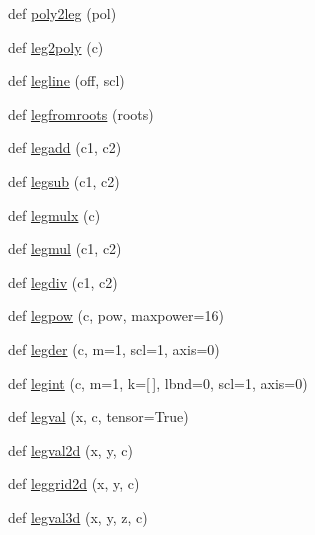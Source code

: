 \begin{DoxyCompactItemize}
\item 
def \hyperlink{namespacenumpy_1_1polynomial_1_1legendre_a64b1806cfd4b9d30acd2e1d549eda549}{poly2leg} (pol)
\item 
def \hyperlink{namespacenumpy_1_1polynomial_1_1legendre_aa88cb7adb4a3cc61a468ceafa8f18189}{leg2poly} (c)
\item 
def \hyperlink{namespacenumpy_1_1polynomial_1_1legendre_acb9eab48c02cb6ebfb9adb1373052b0a}{legline} (off, scl)
\item 
def \hyperlink{namespacenumpy_1_1polynomial_1_1legendre_a77e979bb265a23eed2e9625d13f54299}{legfromroots} (roots)
\item 
def \hyperlink{namespacenumpy_1_1polynomial_1_1legendre_a05031afb4d6c15bb84ba982a362b78c2}{legadd} (c1, c2)
\item 
def \hyperlink{namespacenumpy_1_1polynomial_1_1legendre_af5bfa3c9039d6f2635090f103fc4dc50}{legsub} (c1, c2)
\item 
def \hyperlink{namespacenumpy_1_1polynomial_1_1legendre_a2984b2d596308fda9790e1a276447a61}{legmulx} (c)
\item 
def \hyperlink{namespacenumpy_1_1polynomial_1_1legendre_aa6f050bcc0e660b48550fbaf524f772b}{legmul} (c1, c2)
\item 
def \hyperlink{namespacenumpy_1_1polynomial_1_1legendre_a7ceace6a332caef0058cd77820c06773}{legdiv} (c1, c2)
\item 
def \hyperlink{namespacenumpy_1_1polynomial_1_1legendre_a3b8ae0e57f1fa028b97bbf0c360e3f84}{legpow} (c, pow, maxpower=16)
\item 
def \hyperlink{namespacenumpy_1_1polynomial_1_1legendre_a7697098873adb1e5099f375a6b81ae4f}{legder} (c, m=1, scl=1, axis=0)
\item 
def \hyperlink{namespacenumpy_1_1polynomial_1_1legendre_a1468953b379717b49b193e84b4b99f13}{legint} (c, m=1, k=\mbox{[}$\,$\mbox{]}, lbnd=0, scl=1, axis=0)
\item 
def \hyperlink{namespacenumpy_1_1polynomial_1_1legendre_ae714af9e011ed4987215df6065fc26fa}{legval} (x, c, tensor=True)
\item 
def \hyperlink{namespacenumpy_1_1polynomial_1_1legendre_aa36dea805de5eadac0e36dab6ef89be9}{legval2d} (x, y, c)
\item 
def \hyperlink{namespacenumpy_1_1polynomial_1_1legendre_abfbcabeb839fdd7446799c81bbde5cd6}{leggrid2d} (x, y, c)
\item 
def \hyperlink{namespacenumpy_1_1polynomial_1_1legendre_a3c1afe9a5233c8baf96b034392f7f339}{legval3d} (x, y, z, c)

\end{DoxyCompactItemize}
